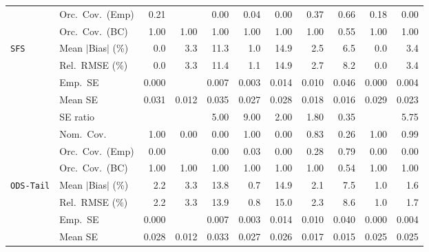 \begin{landscape}
\begin{longtable}{llrrrrrrrrr}
 & Orc.\ Cov.\ (Emp) & \cellcolor{rankthree}0.21 &  & 0.00 & 0.04 & 0.00 & \cellcolor{ranktwo}0.37 & \cellcolor{rankone}0.66 & 0.18 & 0.00 \\
 & Orc.\ Cov.\ (BC) & \cellcolor{rankone}1.00 & \cellcolor{rankone}1.00 & \cellcolor{rankone}1.00 & \cellcolor{rankone}1.00 & \cellcolor{rankone}1.00 & \cellcolor{rankone}1.00 & \cellcolor{ranktwo}0.55 & \cellcolor{rankone}1.00 & \cellcolor{rankone}1.00 \\
\addlinespace[2pt]
\quad \texttt{SFS} & Mean $|$Bias$|$ (\%) & \cellcolor{rankone}0.0 & 3.3 & 11.3 & \cellcolor{ranktwo}1.0 & 14.9 & \cellcolor{rankthree}2.5 & 6.5 & \cellcolor{rankone}0.0 & 3.4 \\
 & Rel.\ RMSE (\%) & \cellcolor{rankone}0.0 & 3.3 & 11.4 & \cellcolor{ranktwo}1.1 & 14.9 & \cellcolor{rankthree}2.7 & 8.2 & \cellcolor{rankone}0.0 & 3.4 \\
 & Emp.\ SE & 0.000 &  & 0.007 & 0.003 & 0.014 & 0.010 & 0.046 & 0.000 & 0.004 \\
 & Mean SE & 0.031 & 0.012 & 0.035 & 0.027 & 0.028 & 0.018 & 0.016 & 0.029 & 0.023 \\
 & SE ratio &  &  & 5.00 & 9.00 & \cellcolor{rankthree}2.00 & \cellcolor{ranktwo}1.80 & \cellcolor{rankone}0.35 &  & 5.75 \\
 & Nom.\ Cov. & \cellcolor{ranktwo}1.00 & 0.00 & 0.00 & \cellcolor{ranktwo}1.00 & 0.00 & \cellcolor{rankthree}0.83 & 0.26 & \cellcolor{ranktwo}1.00 & \cellcolor{rankone}0.99 \\
 & Orc.\ Cov.\ (Emp) & 0.00 &  & 0.00 & \cellcolor{rankthree}0.03 & 0.00 & \cellcolor{ranktwo}0.28 & \cellcolor{rankone}0.79 & 0.00 & 0.00 \\
 & Orc.\ Cov.\ (BC) & \cellcolor{rankone}1.00 & \cellcolor{rankone}1.00 & \cellcolor{rankone}1.00 & \cellcolor{rankone}1.00 & \cellcolor{rankone}1.00 & \cellcolor{rankone}1.00 & \cellcolor{ranktwo}0.54 & \cellcolor{rankone}1.00 & \cellcolor{rankone}1.00 \\
\addlinespace[2pt]
\quad \texttt{ODS-Tail} & Mean $|$Bias$|$ (\%) & 2.2 & 3.3 & 13.8 & \cellcolor{rankone}0.7 & 14.9 & 2.1 & 7.5 & \cellcolor{ranktwo}1.0 & \cellcolor{rankthree}1.6 \\
 & Rel.\ RMSE (\%) & 2.2 & 3.3 & 13.9 & \cellcolor{rankone}0.8 & 15.0 & 2.3 & 8.6 & \cellcolor{ranktwo}1.0 & \cellcolor{rankthree}1.7 \\
 & Emp.\ SE & 0.000 &  & 0.007 & 0.003 & 0.014 & 0.010 & 0.040 & 0.000 & 0.004 \\
 & Mean SE & 0.028 & 0.012 & 0.033 & 0.027 & 0.026 & 0.017 & 0.015 & 0.025 & 0.025 \\

\end{longtable}
\end{landscape}
